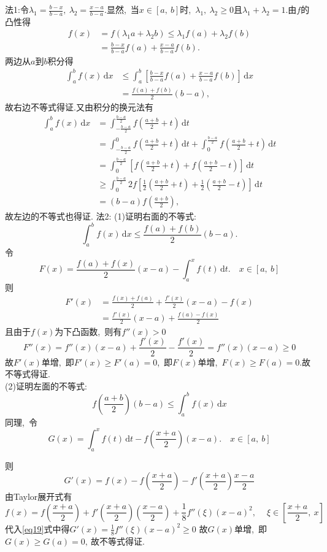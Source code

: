 	\begin{solution}
		法1:令$\lambda_1=\frac{b-x}{b-a},\ \lambda_2=\frac{x-a}{b-a}.$显然,\ 当$x\in \left[a,\ b\right]$时,\ $\lambda_1,\ \lambda_2\ge 0$且$\lambda_1+\lambda_2=1.$由$f$的凸性得
		\begin{align*}
			f(x)&=f(\lambda_1a+\lambda_2b)\le\lambda_1f(a)+\lambda_2f(b)\\
			&=\frac{b-x}{b-a}f(a)+\frac{x-a}{b-a}f(b).
		\end{align*}
		两边从$a$到$b$积分得
		\begin{align*}
			\int_{a}^{b}f(x)\,\text{d}x&\le\int_{a}^{b}\left[\frac{b-x}{b-a}f(a)+\frac{x-a}{b-a}f(b)\right]\,\text{d}x\\
			&=\frac{f(a)+f(b)}{2}(b-a),\ 
		\end{align*}
		故右边不等式得证.又由积分的换元法有
		\begin{align*}
			\int_{a}^{b}f(x)\,\text{d}x&=\int_{-\frac{b-a}{2}}^{\frac{b-a}{2}}f\left(\frac{a+b}{2}+t\right)\,\text{d}t\\
			&=\int_{-\frac{b-a}{2}}^{0}f\left(\frac{a+b}{2}+t\right)\,\text{d}t+\int_{0}^{\frac{b-a}{2}}f\left(\frac{a+b}{2}+t\right)\,\text{d}t\\
			&=\int_{0}^{\frac{b-a}{2}}\left[f\left(\frac{a+b}{2}+t\right)+f\left(\frac{a+b}{2}-t\right)\right]\,\text{d}t\\
			&\ge\int_{0}^{\frac{b-a}{2}}2f\left[\frac{1}{2}\left(\frac{a+b}{2}+t\right)+\frac{1}{2}\left(\frac{a+b}{2}-t\right)\right]\,\text{d}t\\
			&=(b-a)f\left(\frac{a+b}{2}\right),\ 
		\end{align*}
		故左边的不等式也得证.
		\newpage
		法2:
		(1)证明右面的不等式:
		$$\int_{a}^{b}f(x)\,\text{d}x\le\frac{f(a)+f(b)}{2}(b-a).$$
		令
		$$F(x)=\frac{f(a)+f(x)}{2}(x-a)-\int_{a}^{x}f(t)\,\text{d}t.\quad x\in\left[a,\ b\right]$$
		则
		\begin{align*}
			F'(x)&=\frac{f(x)+f(a)}{2}+\frac{f'(x)}{2}(x-a)-f(x)\\
			&=\frac{f'(x)}{2}(x-a)+\frac{f(a)-f(x)}{2}
		\end{align*}
		且由于$f(x)$为下凸函数,\ 则有$f''(x)> 0$
		$$	F''(x)=f''(x)(x-a)+\frac{f'(x)}{2}-\frac{f'(x)}{2}=f''(x)(x-a)\ge 0$$
		故$F'(x)$单增,\ 即$F'(x)\ge F'(a)=0$,\ 即$F(x)$单增,\ $F(x)\ge F(a)=0.$故不等式得证.\\
		(2)证明左面的不等式:
		$$f\left(\frac{a+b}{2}\right)(b-a)\le \int_{a}^{b}f(x)\,\text{d}x$$
		同理,\ 令
		\begin{equation}
			G(x)=\int_{a}^{x}f(t)\,\text{d}t-f\left(\frac{x+a}{2}\right)(x-a).\quad x\in \left[a,\ b\right]\label{eq19}
		\end{equation}
		
		则$$G'(x)=f(x)-f(\frac{x+a}{2})-f'(\frac{x+a}{2})\frac{x-a}{2}$$
		由Taylor展开式有
		$$f(x)=f(\frac{x+a}{2})+f'(\frac{x+a}{2})\left(\frac{x-a}{2}\right)+\frac{1}{8}f''(\xi)(x-a)^2,\ \quad \xi \in \left[\frac{x+a}{2},\ x\right]$$
		代入\eqref{eq19}式中得$G'(x)=\frac{1}{8}f''(\xi)(x-a)^2\ge 0$
		故$G(x)$单增,\ 即$G(x)\ge G(a)=0,\ $故不等式得证.
	\end{solution}
